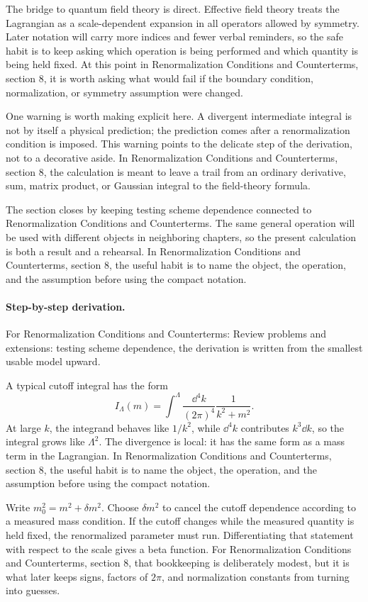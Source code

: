 The bridge to quantum field theory is direct.  Effective field theory treats the Lagrangian as a scale-dependent expansion in all operators allowed by symmetry.  Later notation will carry more indices and fewer verbal reminders, so the safe habit is to keep asking which operation is being performed and which quantity is being held fixed.  At this point in Renormalization Conditions and Counterterms, section 8, it is worth asking what would fail if the boundary condition, normalization, or symmetry assumption were changed.

One warning is worth making explicit here.  A divergent intermediate integral is not by itself a physical prediction; the prediction comes after a renormalization condition is imposed.  This warning points to the delicate step of the derivation, not to a decorative aside.  In Renormalization Conditions and Counterterms, section 8, the calculation is meant to leave a trail from an ordinary derivative, sum, matrix product, or Gaussian integral to the field-theory formula.

The section closes by keeping testing scheme dependence connected to Renormalization Conditions and Counterterms.  The same general operation will be used with different objects in neighboring chapters, so the present calculation is both a result and a rehearsal.  In Renormalization Conditions and Counterterms, section 8, the useful habit is to name the object, the operation, and the assumption before using the compact notation.



\paragraph{Step-by-step derivation.}

For Renormalization Conditions and Counterterms: Review problems and extensions: testing scheme dependence, the derivation is written from the smallest usable model upward.

A typical cutoff integral has the form
\[
  I_\Lambda(m)=\int^{\Lambda}\frac{\dd^4k}{(2\pi)^4}\frac{1}{k^2+m^2}.
\]
At large \(k\), the integrand behaves like \(1/k^2\), while \(\dd^4k\) contributes \(k^3\dd k\), so the integral grows like \(\Lambda^2\).  The divergence is local: it has the same form as a mass term in the Lagrangian.  In Renormalization Conditions and Counterterms, section 8, the useful habit is to name the object, the operation, and the assumption before using the compact notation.

Write \(m_0^2=m^2+\delta m^2\).  Choose \(\delta m^2\) to cancel the cutoff dependence according to a measured mass condition.  If the cutoff changes while the measured quantity is held fixed, the renormalized parameter must run.  Differentiating that statement with respect to the scale gives a beta function.  For Renormalization Conditions and Counterterms, section 8, that bookkeeping is deliberately modest, but it is what later keeps signs, factors of \(2\pi\), and normalization constants from turning into guesses.

